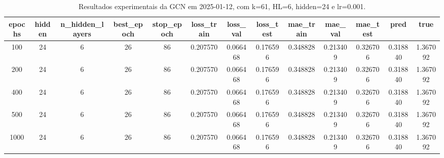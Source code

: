 \begin{table}[h]
\centering
\caption{Resultados experimentais da GCN em 2025-01-12, com k=61, HL=6, hidden=24 e lr=0.001.}
\label{tab:gcn_results_k61_hl6_h24_d20250112}
\begin{tabular}{ccccccccccccc}
\toprule
epochs & hidden & n\_hidden\_layers & best\_epoch & stop\_epoch & loss\_train & loss\_val & loss\_test & mae\_train & mae\_val & mae\_test & pred & true \\
\midrule
100 & 24 & 6 & 26 & 86 & 0.207570 & 0.066468 & 0.176596 & 0.348828 & 0.213409 & 0.326706 & 0.318840 & 1.367092 \\
200 & 24 & 6 & 26 & 86 & 0.207570 & 0.066468 & 0.176596 & 0.348828 & 0.213409 & 0.326706 & 0.318840 & 1.367092 \\
400 & 24 & 6 & 26 & 86 & 0.207570 & 0.066468 & 0.176596 & 0.348828 & 0.213409 & 0.326706 & 0.318840 & 1.367092 \\
500 & 24 & 6 & 26 & 86 & 0.207570 & 0.066468 & 0.176596 & 0.348828 & 0.213409 & 0.326706 & 0.318840 & 1.367092 \\
1000 & 24 & 6 & 26 & 86 & 0.207570 & 0.066468 & 0.176596 & 0.348828 & 0.213409 & 0.326706 & 0.318840 & 1.367092 \\
\bottomrule
\end{tabular}
\end{table}
